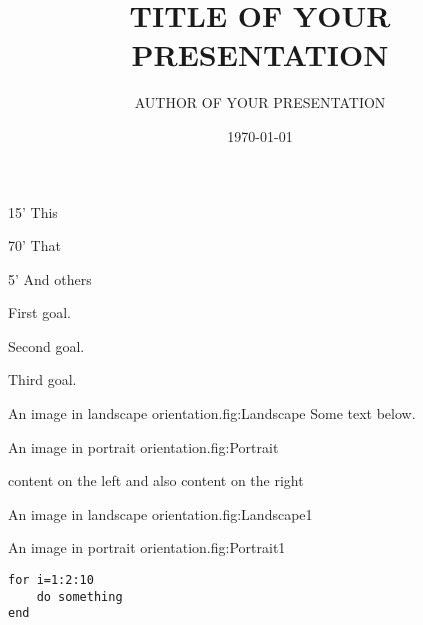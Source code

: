 \documentclass[usenames,dvipsnames]{beamer}
\title{TITLE OF YOUR PRESENTATION}
\author{AUTHOR OF YOUR PRESENTATION}
\date{\today}
\begin{document}
\maketitle

\begin{TFTimeSchedule}
\item 15' This
\item 70' That
\item 5'  And others
\end{TFTimeSchedule}

\begin{TFLearningObjectives}
\item First goal.
\item Second goal.
\item Third goal.
\end{TFLearningObjectives}

\begin{TFPicture}[Landscape]{An image in landscape orientation.}{fig:Landscape}
Some text below.
\end{TFPicture}

\begin{TFPicture}[Portrait]{An image in portrait orientation.}{fig:Portrait}
\end{TFPicture}

\begin{TFTwoColumns}[Title]
{content on the left}
{and also content on the right}
\end{TFTwoColumns}

\begin{TFTwoColumns}[Title]
{
\begin{TPPicture}[Landscape]{An image in landscape orientation.}{fig:Landscape1}
\end{TPPicture}
}
{
\begin{TPPicture}[Portrait]{An image in portrait orientation.}{fig:Portrait1}
\end{TPPicture}
}
\end{TFTwoColumns}

\begin{frame}[fragile]
\matlab
\begin{center}
\begin{minipage}{0.9\linewidth}
\begin{lstlisting}
for i=1:2:10
	do something
end
\end{lstlisting}
\end{minipage}
\end{center}
\end{frame}
\end{document}
